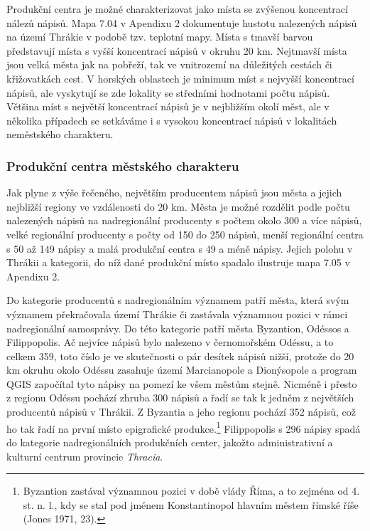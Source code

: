Produkční centra je možné charakterizovat jako místa se zvýšenou koncentrací nálezů nápisů. Mapa 7.04 v Apendixu 2 dokumentuje hustotu nalezených nápisů na území Thrákie v podobě tzv. teplotní mapy. Místa s tmavší barvou představují místa s vyšší koncentrací nápisů v okruhu 20 km. Nejtmavší místa jsou velká města jak na pobřeží, tak ve vnitrozemí na důležitých cestách či křižovatkách cest. V horských oblastech je minimum míst s nejvyšší koncentrací nápisů, ale vyskytují se zde lokality se středními hodnotami počtu nápisů. Většina míst s největší koncentrací nápisů je v nejbližším okolí měst, ale v několika případech se setkáváme i s vysokou koncentrací nápisů v lokalitách neměstského charakteru.

\subsubsection[produkční-centra-městského-charakteru]{Produkční centra městského charakteru}

Jak plyne z výše řečeného, největším producentem nápisů jsou města a jejich nejbližší regiony ve vzdálenosti do 20 km. Města je možné rozdělit podle počtu nalezených nápisů na nadregionální producenty s počtem okolo 300 a více nápisů, velké regionální producenty s počty od 150 do 250 nápisů, menší regionální centra s 50 až 149 nápisy a malá produkční centra s 49 a méně nápisy. Jejich polohu v Thrákii a kategorii, do níž dané produkční místo spadalo ilustruje mapa 7.05 v Apendixu 2.

Do kategorie producentů s nadregionálním významem patří města, která svým významem překračovala území Thrákie či zastávala významnou pozici v rámci nadregionální samosprávy. Do této kategorie patří města Byzantion, Odéssos a Filippopolis. Ač nejvíce nápisů bylo nalezeno v černomořském Odéssu, a to celkem 359, toto číslo je ve skutečnosti o pár desítek nápisů nižší, protože do 20 km okruhu okolo Odéssu zasahuje území Marcianopole a Dionýsopole a program QGIS započítal tyto nápisy na pomezí ke všem městům stejně. Nicméně i přesto z regionu Odéssu pochází zhruba 300 nápisů a řadí se tak k jedněm z největších producentů nápisů v Thrákii. Z Byzantia a jeho regionu pochází 352 nápisů, což ho tak řadí na první místo epigrafické produkce.\footnote{Byzantion zastával významnou pozici v době vlády Říma, a to zejména od 4. st. n. l., kdy se stal pod jménem Konstantinopol hlavním městem římské říše (Jones 1971, 23).} Filippopolis s 296 nápisy spadá do kategorie nadregionálních produkčních center, jakožto administrativní a kulturní centrum provincie {\em Thracia}.

